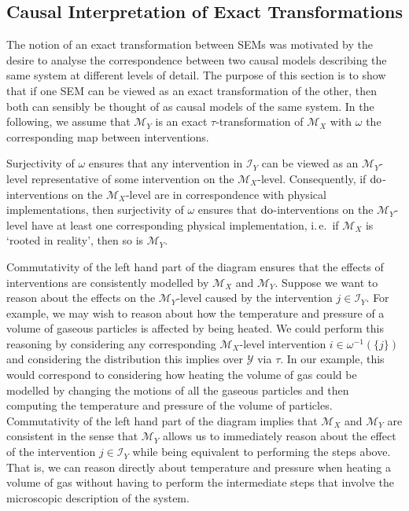 \subsection{Causal Interpretation of Exact Transformations}\label{subsec:causal-interpretation-transformation}

The notion of an exact transformation between SEMs was motivated by the desire to analyse the correspondence between two causal models describing the same system at different levels of detail.
The purpose of this section is to show that if one SEM can be viewed as an exact transformation of the other, then both can sensibly be thought of as causal models of the same system. In the following, we assume that $\mathcal{M}_Y$ is an exact $\tau$-transformation of $\mathcal{M}_X$ with $\omega$ the corresponding map between interventions.

Surjectivity of $\omega$ ensures that any intervention in $\mathcal{I}_Y$ can be viewed as an $\mathcal{M}_Y$-level representative of some intervention on the $\mathcal{M}_X$-level. Consequently, if $\operatorname{do}$-interventions on the $\mathcal{M}_X$-level are in correspondence with physical implementations, then surjectivity of $\omega$ ensures that $\operatorname{do}$-interventions on the $\mathcal{M}_Y$-level have at least one corresponding physical implementation, i.\,e.\ if $\mathcal{M}_X$ is `rooted in reality', then so is $\mathcal{M}_Y$.

Commutativity of the left hand part of the diagram ensures that the effects of interventions are consistently modelled by $\mathcal{M}_X$ and $\mathcal{M}_Y$.
Suppose we want to reason about the effects on the $\mathcal{M}_Y$-level caused by the intervention $j \in \mathcal{I}_Y$.
For example, we may wish to reason about how the temperature and pressure of a volume of gaseous particles is affected by being heated.
We could perform this reasoning by considering any corresponding $\mathcal{M}_X$-level intervention $i \in \omega^{-1}(\{j\})$ and considering the distribution this implies over $\mathcal{Y}$ via $\tau$.
In our example, this would correspond to considering how heating the volume of gas could be modelled by changing the motions of all the gaseous particles and then computing the temperature and pressure of the volume of particles.
Commutativity of the left hand part of the diagram implies that $\mathcal{M}_X$ and $\mathcal{M}_Y$ are consistent in the sense that $\mathcal{M}_Y$ allows us to immediately reason about the effect of the intervention $j\in\mathcal{I}_Y$ while being equivalent to performing the steps above.
That is, we can reason directly about temperature and pressure when heating a volume of gas without having to perform the intermediate steps that involve the microscopic description of the system.

